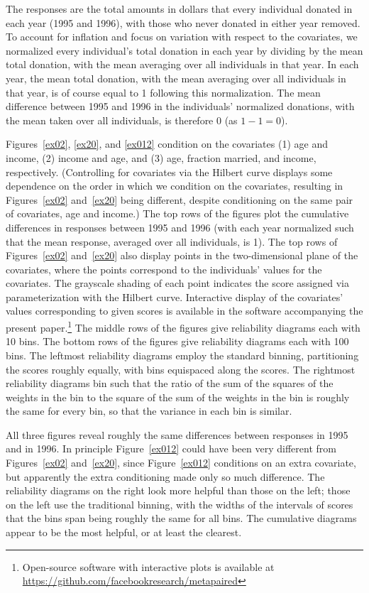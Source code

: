\documentclass{article}
\begin{document}
The responses are the total amounts in dollars that every individual donated
in each year (1995 and 1996), with those who never donated in either year
removed. To account for inflation and focus on variation with respect
to the covariates, we normalized every individual's total donation in each year
by dividing by the mean total donation, with the mean averaging
over all individuals in that year. In each year, the mean total donation,
with the mean averaging over all individuals in that year,
is of course equal to 1 following this normalization.
The mean difference between 1995 and 1996
in the individuals' normalized donations,
with the mean taken over all individuals, is therefore 0 (as $1 - 1 = 0$).

Figures~\ref{ex02}, \ref{ex20}, and \ref{ex012} condition on the covariates
(1) age and income, (2) income and age,
and (3) age, fraction married, and income, respectively.
(Controlling for covariates via the Hilbert curve displays some dependence
on the order in which we condition on the covariates,
resulting in Figures~\ref{ex02} and~\ref{ex20} being different,
despite conditioning on the same pair of covariates, age and income.)
The top rows of the figures plot the cumulative differences in responses
between 1995 and 1996 (with each year normalized such that the mean response,
averaged over all individuals, is 1).
The top rows of Figures~\ref{ex02} and~\ref{ex20} also display
points in the two-dimensional plane of the covariates,
where the points correspond to the individuals' values for the covariates.
The grayscale shading of each point indicates the score assigned
via parameterization with the Hilbert curve. Interactive display
of the covariates' values corresponding to given scores is available
in the software accompanying the present paper.\footnote{Open-source software
with interactive plots is available at
\url{https://github.com/facebookresearch/metapaired}}
The middle rows of the figures give reliability diagrams each with 10 bins.
The bottom rows of the figures give reliability diagrams each with 100 bins.
The leftmost reliability diagrams employ the standard binning,
partitioning the scores roughly equally, with bins equispaced along the scores.
The rightmost reliability diagrams bin such that the ratio
of the sum of the squares of the weights in the bin
to the square of the sum of the weights in the bin
is roughly the same for every bin, so that the variance in each bin is similar.

All three figures reveal roughly the same differences between responses
in 1995 and in 1996. In principle Figure~\ref{ex012}
could have been very different from Figures~\ref{ex02} and~\ref{ex20},
since Figure~\ref{ex012} conditions on an extra covariate,
but apparently the extra conditioning made only so much difference.
The reliability diagrams on the right look more helpful
than those on the left; those on the left use the traditional binning,
with the widths of the intervals of scores
that the bins span being roughly the same for all bins.
The cumulative diagrams appear to be the most helpful,
or at least the clearest.
\end{document}
